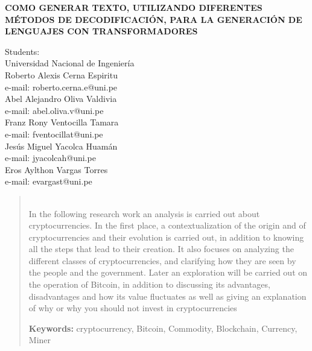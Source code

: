 \documentclass[10pt,twocolumn]{article}
\theoremstyle{definition}
\begin{document}
	
\begin{center}
	\vspace{5pt}
	{\large \textbf{COMO GENERAR TEXTO, UTILIZANDO DIFERENTES MÉTODOS DE DECODIFICACIÓN, PARA LA GENERACIÓN DE LENGUAJES CON TRANSFORMADORES}}\\
\end{center}

\begin{center}
	Students:\\
	\vspace{5pt}
	Universidad Nacional de Ingeniería\\
	\vspace{5pt}
	{\large Roberto Alexis Cerna Espiritu }\\
	e-mail: roberto.cerna.e@uni.pe\\
	{\large Abel Alejandro Oliva Valdivia }\\
	e-mail: abel.oliva.v@uni.pe\\
	{\large Franz Rony Ventocilla Tamara }\\
	e-mail: fventocillat@uni.pe\\
	{\large Jesús Miguel Yacolca Huamán }\\
	e-mail: jyacolcah@uni.pe\\
	{\large Eros Aylthon Vargas Torres }\\
	e-mail: evargast@uni.pe\\
	
\end{center}
\vspace{5pt}
\vspace{20pt}
\begin{abstract}
{\small
\hspace*{0.5cm}



\\
In the following research work an analysis is carried out about cryptocurrencies. In the first place, a contextualization of the origin and of cryptocurrencies and their evolution is carried out, in addition to knowing all the steps that lead to their creation. It also focuses on analyzing the different classes of cryptocurrencies, and clarifying how they are seen by the people and the government. Later an exploration will be carried out on the operation of Bitcoin, in addition to discussing its advantages, disadvantages and how its value fluctuates as well as giving an explanation of why or why you should not invest in cryptocurrencies

\textbf{Keywords:} cryptocurrency, Bitcoin, Commodity, Blockchain, Currency, Miner
}
\end{abstract}
\end{document}
